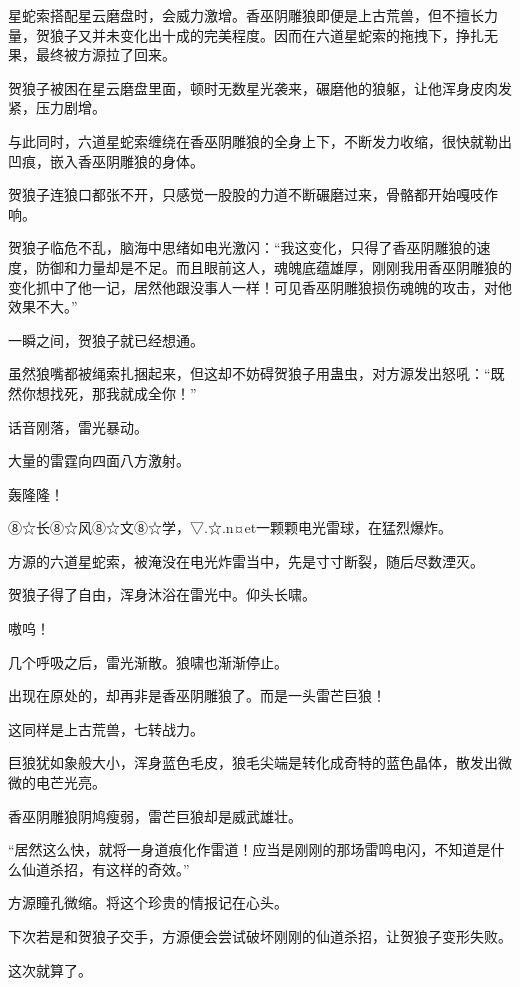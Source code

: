 
\begin{this_body}

星蛇索搭配星云磨盘时，会威力激增。香巫阴雕狼即便是上古荒兽，但不擅长力量，贺狼子又并未变化出十成的完美程度。因而在六道星蛇索的拖拽下，挣扎无果，最终被方源拉了回来。

贺狼子被困在星云磨盘里面，顿时无数星光袭来，碾磨他的狼躯，让他浑身皮肉发紧，压力剧增。

与此同时，六道星蛇索缠绕在香巫阴雕狼的全身上下，不断发力收缩，很快就勒出凹痕，嵌入香巫阴雕狼的身体。

贺狼子连狼口都张不开，只感觉一股股的力道不断碾磨过来，骨骼都开始嘎吱作响。

贺狼子临危不乱，脑海中思绪如电光激闪：“我这变化，只得了香巫阴雕狼的速度，防御和力量却是不足。而且眼前这人，魂魄底蕴雄厚，刚刚我用香巫阴雕狼的变化抓中了他一记，居然他跟没事人一样！可见香巫阴雕狼损伤魂魄的攻击，对他效果不大。”

一瞬之间，贺狼子就已经想通。

虽然狼嘴都被绳索扎捆起来，但这却不妨碍贺狼子用蛊虫，对方源发出怒吼：“既然你想找死，那我就成全你！”

话音刚落，雷光暴动。

大量的雷霆向四面八方激射。

轰隆隆！

⑧☆长⑧☆风⑧☆文⑧☆学，▽.☆.n¤et一颗颗电光雷球，在猛烈爆炸。

方源的六道星蛇索，被淹没在电光炸雷当中，先是寸寸断裂，随后尽数湮灭。

贺狼子得了自由，浑身沐浴在雷光中。仰头长啸。

嗷呜！

几个呼吸之后，雷光渐散。狼啸也渐渐停止。

出现在原处的，却再非是香巫阴雕狼了。而是一头雷芒巨狼！

这同样是上古荒兽，七转战力。

巨狼犹如象般大小，浑身蓝色毛皮，狼毛尖端是转化成奇特的蓝色晶体，散发出微微的电芒光亮。

香巫阴雕狼阴鸠瘦弱，雷芒巨狼却是威武雄壮。

“居然这么快，就将一身道痕化作雷道！应当是刚刚的那场雷鸣电闪，不知道是什么仙道杀招，有这样的奇效。”

方源瞳孔微缩。将这个珍贵的情报记在心头。

下次若是和贺狼子交手，方源便会尝试破坏刚刚的仙道杀招，让贺狼子变形失败。

这次就算了。


\end{this_body}
